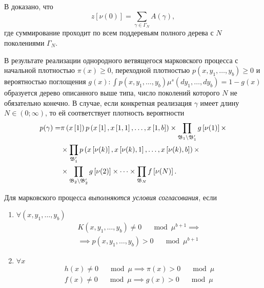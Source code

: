В \cite{montekarlo1975} доказано, что 
\begin{equation}\label{eq:subtrees}
z\left[\nu(0)\right] = \sum_{\gamma\in\Gamma_N}A\left(\gamma\right),
\end{equation}
где суммирование проходит по всем поддеревьям полного дерева с $N$ поколениями $\Gamma_N$.

В результате реализации однородного ветвящегося марковского процесса с начальной плотностью $\pi\left(x\right) \geq 0$, переходной плотностью $p(x,y_1,\ldots,y_b) \geq 0$ и вероятностью поглощения $g\left(x\right): \int p(x,y_1,\ldots,y_b) \mu^s\left(dy_1, \ldots, dy_b\right) = 1 - g(x)$ образуется дерево описанного выше типа, число поколений которого $N$ не обязательно конечно. В случае, если конкретная реализация $\gamma$ имеет длину $N\in(0;\infty)$, то ей соответствует плотность вероятности
\begin{align*}
	p(\gamma) = &\pi\left(x\left[1\right]\right)p\left(x\left[1\right], x\left[1,1\right], \ldots ,x\left[1,b\right]\right)\times \prod_{\mathfrak{B}_1\setminus\mathfrak{B}'_1}g\left[\nu(1)\right] \times \\
	&\times \prod_{\mathfrak{B}'_1}p\left(x\left[\nu(k)\right], x\left[\nu(k),1\right], \ldots ,x\left[\nu(k),b\right]\right) \times \\
	&\times \prod_{\mathfrak{B}_2\setminus\mathfrak{B}'_2}g\left[\nu(2)\right]\times \cdots \times\prod_{\mathfrak{B}_N}f\left[\nu(N)\right].
\end{align*}

Для марковского процесса \emph{выполняются условия согласования}, если
\begin{enumerate}
 \item $\forall (x,y_1, \ldots, y_b)$ 
$$
\begin{aligned}
K\left(x, y_1, \ldots, y_b\right) \neq 0 \quad \mod \mu^{b+1} \implies \\ \implies p\left(x, y_1, \ldots, y_b\right) > 0 \quad \mod \mu^{b+1}
\end{aligned}$$
\item $\forall x$ $$
\begin{aligned}
h(x) \neq 0\quad \mod \mu \implies \pi(x) > 0\quad \mod \mu \\
f(x) \neq 0\quad \mod \mu \implies g(x) > 0\quad \mod \mu 
\end{aligned}$$
\end{enumerate}

